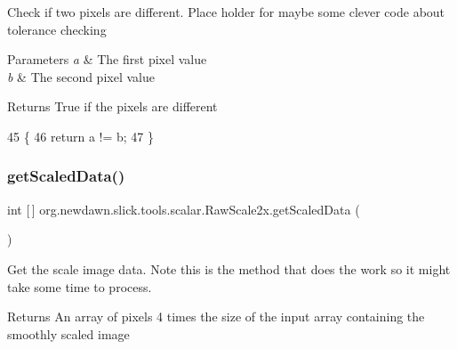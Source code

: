 Check if two pixels are different. Place holder for maybe some clever code about tolerance checking


\begin{DoxyParams}{Parameters}
{\em a} & The first pixel value \\
\hline
{\em b} & The second pixel value \\
\hline
\end{DoxyParams}
\begin{DoxyReturn}{Returns}
True if the pixels are different 
\end{DoxyReturn}

\begin{DoxyCode}
45     \{
46         \textcolor{keywordflow}{return} a != b;
47     \}
\end{DoxyCode}
\mbox{\label{classorg_1_1newdawn_1_1slick_1_1tools_1_1scalar_1_1_raw_scale2x_a89ae2bf07fe3affbec9e738bfbf107a3}} 
\subsubsection{\texorpdfstring{get\+Scaled\+Data()}{getScaledData()}}
{\footnotesize\ttfamily int \mbox{[}$\,$\mbox{]} org.\+newdawn.\+slick.\+tools.\+scalar.\+Raw\+Scale2x.\+get\+Scaled\+Data (\begin{DoxyParamCaption}{ }\end{DoxyParamCaption})\hspace{0.3cm}{\ttfamily [inline]}}

Get the scale image data. Note this is the method that does the work so it might take some time to process.

\begin{DoxyReturn}{Returns}
An array of pixels 4 times the size of the input array containing the smoothly scaled image 
\end{DoxyReturn}

